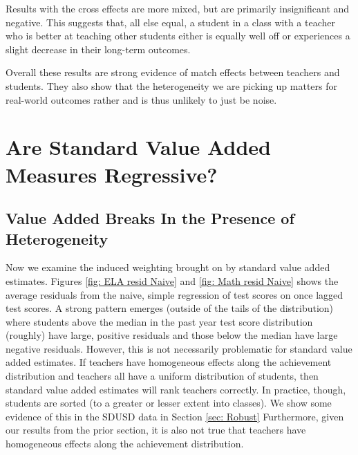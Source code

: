 \documentclass[letterpaper,12pt]{article}
\begin{document}
Results with the cross effects are more mixed, but are primarily insignificant and negative. This suggests that, all else equal, a student in a class with a teacher who is better at teaching other students either is equally well off or experiences a slight decrease in their long-term outcomes.

Overall these results are strong evidence of match effects between teachers and students. They also show that the heterogeneity we are picking up matters for real-world outcomes rather and is thus unlikely to just be noise.




\section{Are Standard Value Added Measures Regressive?}\label{sec: Regressive VA}

\subsection{Value Added Breaks In the Presence of Heterogeneity}

Now we examine the induced weighting brought on by standard value added estimates. Figures \ref{fig: ELA resid Naive} and \ref{fig: Math resid Naive} shows the average residuals from the naive, simple regression of test scores on once lagged test scores. A strong pattern emerges (outside of the tails of the distribution) where students above the median in the past year test score distribution (roughly) have large, positive residuals and those below the median have large negative residuals. However, this is not necessarily problematic for standard value added estimates. If teachers have homogeneous effects along the achievement distribution and teachers all have a uniform distribution of students, then standard value added estimates will rank teachers correctly. In practice, though, students are sorted (to a greater or lesser extent into classes). We show some evidence of this in the SDUSD data in Section \ref{sec: Robust} Furthermore, given our results from the prior section, it is also not true that teachers have homogeneous effects along the achievement distribution. 
\end{document}

